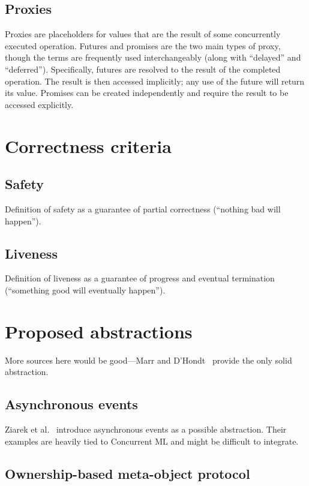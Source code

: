 \documentclass{sig-alternate}
\begin{document}
\subsection{Proxies}

Proxies are placeholders for values that are the result of some concurrently executed operation. Futures and promises are the two main types of proxy, though the terms are frequently used interchangeably (along with ``delayed'' and ``deferred''). Specifically, futures are resolved to the result of the completed operation. The result is then accessed implicitly; any use of the future will return its value. Promises can be created independently and require the result to be accessed explicitly.

\section{Correctness criteria}

\subsection{Safety}

Definition of safety as a guarantee of partial correctness (``nothing bad will happen'').

\subsection{Liveness}

Definition of liveness as a guarantee of progress and eventual termination (``something good will eventually happen'').

\section{Proposed abstractions}

More sources here would be good---Marr and D'Hondt~\cite{Marr2012} provide the only solid abstraction.

\subsection{Asynchronous events}

Ziarek et al.~\cite{Ziarek2011} introduce asynchronous events as a possible abstraction. Their examples are heavily tied to Concurrent ML and might be difficult to integrate.

\subsection{Ownership-based meta-object protocol}
\end{document}
